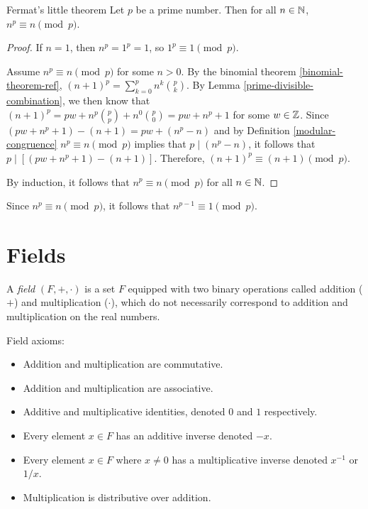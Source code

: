 \begin{thm}{Fermat's little theorem}\label{fermat-little-theorem}\proofbreak
    Let $p$ be a prime number. Then for all $n \in \mathbb{N}$, $n^p \equiv n \pmod p$.
\end{thm}

\begin{proof}
    If $n = 1$, then $n^p = 1^p = 1$, so $1^p \equiv 1 \pmod p$.

    Assume $n^p \equiv n \pmod p$ for some $n > 0$. By the binomial theorem \ref{binomial-theorem-ref}, $(n+1)^p = \sum_{k=0}^pn^k\binom{p}{k}$. By Lemma \ref{prime-divisible-combination}, we then know that $(n+1)^p = pw + n^p\binom{p}{p} + n^0\binom{p}{0} = pw + n^p + 1$ for some $w \in \mathbb{Z}$. Since $(pw + n^p + 1) - (n + 1) = pw + (n^p - n)$ and by Definition \ref{modular-congruence} $n^p \equiv n \pmod p$ implies that $p \mid (n^p - n)$, it follows that $p \mid \left[(pw + n^p + 1) - (n + 1)\right]$. Therefore, $(n+1)^p \equiv (n+1) \pmod p$.

    By induction, it follows that $n^p \equiv n \pmod p$ for all $n \in \mathbb{N}$.
\end{proof}

\begin{cor}\label{fermat-little-corallary}
    Since $n^p \equiv n \pmod p$, it follows that $n^{p-1} \equiv 1 \pmod p$.
\end{cor}

\section{Fields}

\begin{defn}
    A \emph{field} $(F, +, \cdot)$ is a set $F$ equipped with two binary operations called addition ($+$) and multiplication ($\cdot$), which do not necessarily correspond to addition and multiplication on the real numbers.

    Field axioms:
    \begin{itemize}
        \item Addition and multiplication are commutative.
        \item Addition and multiplication are associative.
        \item Additive and multiplicative identities, denoted $0$ and $1$ respectively.
        \item Every element $x \in F$ has an additive inverse denoted $-x$.
        \item Every element $x \in F$ where $x \neq 0$ has a multiplicative inverse denoted $x^{-1}$ or $1/x$.
        \item Multiplication is distributive over addition.
    \end{itemize}
\end{defn}

